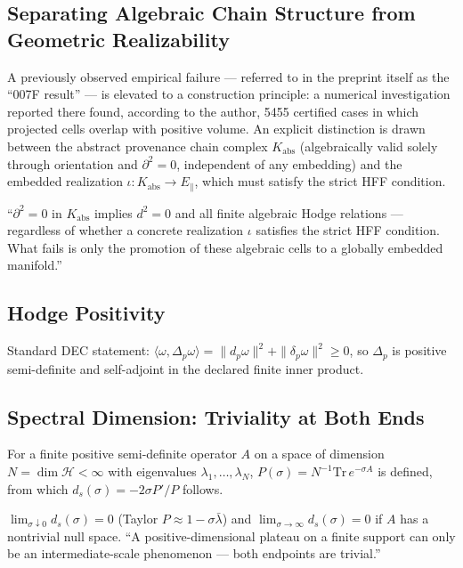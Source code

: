 \subsection{Separating Algebraic Chain Structure from Geometric Realizability}

A previously observed empirical failure — referred to in the preprint
itself as the ``007F result'' — is elevated to a construction principle:
a numerical investigation reported there found, according to the author,
5455 certified cases in which projected cells overlap with positive
volume. An explicit distinction is drawn between the abstract provenance
chain complex $K_{\mathrm{abs}}$ (algebraically valid solely through
orientation and $\partial^2=0$, independent of any embedding) and the
embedded realization $\iota:K_{\mathrm{abs}}\to E_\parallel$, which must
satisfy the strict HFF condition.

\begin{kernbox}[title={Clean Isolation of the Failure}]
``$\partial^2=0$ in $K_{\mathrm{abs}}$ implies $d^2=0$ and all finite
algebraic Hodge relations — regardless of whether a concrete realization
$\iota$ satisfies the strict HFF condition. What fails is only the
promotion of these algebraic cells to a globally embedded manifold.''
\end{kernbox}

\subsection{Hodge Positivity}

Standard DEC statement: $\langle\omega,\Delta_p\omega\rangle=\|d_p\omega\|^2+\|\delta_p\omega\|^2\geq0$,
so $\Delta_p$ is positive semi-definite and self-adjoint in the declared
finite inner product.

\subsection{Spectral Dimension: Triviality at Both Ends}

For a finite positive semi-definite operator $A$ on a space of dimension
$N=\dim\mathcal H<\infty$ with eigenvalues $\lambda_1,\dots,\lambda_N$,
$P(\sigma)=N^{-1}\mathrm{Tr}\,e^{-\sigma A}$ is defined, from which
$d_s(\sigma)=-2\sigma P'/P$ follows.

\begin{kernbox}[title={Unavoidable Consequence}]
$\lim_{\sigma\downarrow0}d_s(\sigma)=0$ (Taylor $P\approx1-\sigma\bar\lambda$)
and $\lim_{\sigma\to\infty}d_s(\sigma)=0$ if $A$ has a nontrivial null
space. ``A positive-dimensional plateau on a finite support can only be
an intermediate-scale phenomenon — both endpoints are trivial.''
\end{kernbox}

